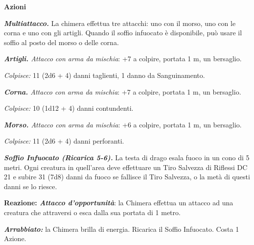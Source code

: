 \begin{multicols}{2}
{\textbf{Azioni}

\emph{\textbf{Multiattacco.}} La chimera effettua tre attacchi: uno con il morso, uno con le corna e uno con gli artigli. Quando il soffio infuocato è disponibile, può usare il soffio al posto del morso o delle corna.

\emph{\textbf{Artigli.} Attacco con arma da mischia}: +7 a colpire, portata 1 m, un bersaglio.

\emph{Colpisce:} 11 (2d6 + 4) danni taglienti, 1 danno da Sanguinamento.

\emph{\textbf{Corna.} Attacco con arma da mischia}: +7 a colpire, portata 1 m, un bersaglio.

\emph{Colpisce:} 10 (1d12 + 4) danni contundenti.

\emph{\textbf{Morso.} Attacco con arma da mischia}: +6 a colpire, portata 1 m, un bersaglio.

\emph{Colpisce:} 11 (2d6 + 4) danni perforanti.

\emph{\textbf{Soffio Infuocato (Ricarica 5-6).}} La testa di drago esala fuoco in un cono di 5 metri. Ogni creatura in quell'area deve effettuare un Tiro Salvezza di Riflessi DC 21 e subire 31 (7d8) danni da fuoco se fallisce il Tiro Salvezza, o la metà di questi danni se lo riesce.

\textbf{Reazione: \emph{Attacco d'opportunità}}: la Chimera effettua un attacco ad una creatura che attraversi o esca dalla sua portata di 1 metro.

\emph{\textbf{Arrabbiato:}} la Chimera brilla di energia. Ricarica il Soffio Infuocato. Costa 1 Azione.

}
\end{multicols}
